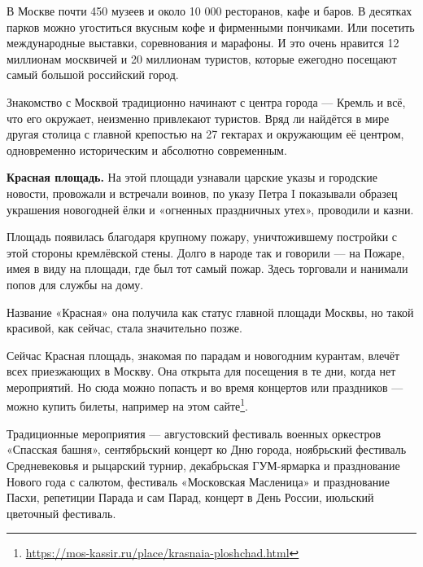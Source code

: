 В Москве почти 450 музеев и около 10 000 ресторанов, кафе и баров. В десятках парков можно угоститься вкусным кофе и фирменными пончиками. Или посетить международные выставки, соревнования и марафоны. И это очень нравится 12 миллионам москвичей и 20 миллионам туристов, которые ежегодно посещают самый большой российский город.

Знакомство с Москвой традиционно начинают с центра города --- Кремль и всё, что его окружает, неизменно привлекают туристов. Вряд ли найдётся в мире другая столица с главной крепостью на 27 гектарах и окружающим её центром, одновременно историческим и абсолютно современным.

\textbf{Красная площадь.} На этой площади узнавали царские указы и городские новости, провожали и встречали воинов, по указу Петра I показывали образец украшения новогодней ёлки и «огненных праздничных утех», проводили  и казни.

Площадь появилась благодаря крупному пожару, уничтожившему постройки с этой стороны кремлёвской стены. Долго в народе так и говорили --- на Пожаре, имея в виду на площади, где был тот самый пожар. Здесь торговали и нанимали попов для службы на дому.

Название «Красная» она получила как статус главной площади Москвы, но такой красивой, как сейчас, стала значительно позже.


Сейчас Красная площадь, знакомая по парадам и новогодним курантам, влечёт всех приезжающих в Москву. Она открыта для посещения в те дни, когда нет мероприятий. Но сюда можно попасть и во время концертов или праздников — можно купить билеты, например на этом сайте\footnote{\url{https://mos-kassir.ru/place/krasnaia-ploshchad.html}}.

Традиционные мероприятия --- августовский фестиваль военных оркестров «Спасская башня», сентябрьский концерт ко Дню города, ноябрьский фестиваль Средневековья и рыцарский турнир, декабрьская ГУМ-ярмарка и празднование Нового года с салютом, фестиваль «Московская Масленица» и празднование Пасхи, репетиции Парада и сам Парад, концерт в День России, июльский цветочный фестиваль.


